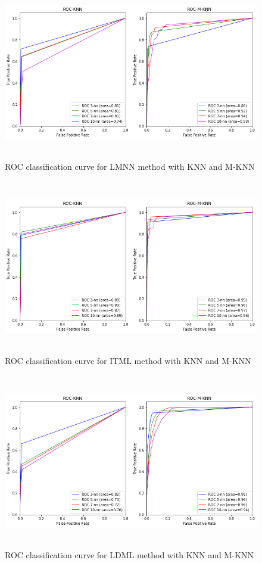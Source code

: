 \documentclass{article}
\begin{document}
\begin{figure}[H]
    \centering
    \includegraphics[height=3in]{./lmnn_olv_result.png}
    \caption[LMNN: ROC on Olivetti faces dataset]{ROC classification curve for LMNN method with KNN and M-KNN}
    \label{fig:fig_name}
\end{figure}

\begin{figure}[H]
    \centering
    \includegraphics[height=3in]{./itml_olv_result.png}
    \caption[ITML: ROC on Olivetti faces dataset]{ROC classification curve for ITML method with KNN and M-KNN}
    \label{fig:fig_name}
\end{figure}

\begin{figure}[H]
    \centering
    \includegraphics[height=3in]{./ldml_olv_result.png}
    \caption[LDML: ROC on Olivetti faces dataset]{ROC classification curve for LDML method with KNN and M-KNN}
    \label{fig:fig_name}
\end{figure}
\end{document}
